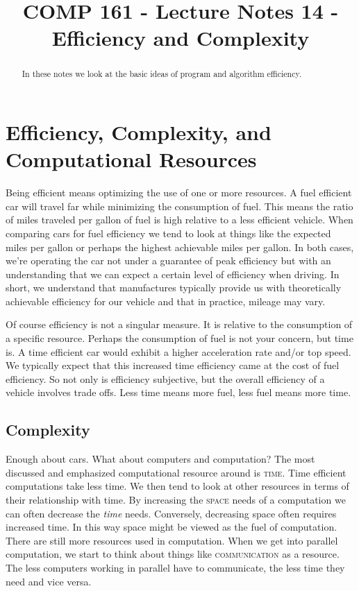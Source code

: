 \documentclass[]{tufte-handout}
\title{COMP 161 - Lecture Notes 14 - Efficiency and Complexity}
\date{}
\begin{document}
 
\maketitle

\begin{abstract}
In these notes we look at the basic ideas of program and algorithm efficiency.
\end{abstract}

\section{Efficiency, Complexity, and Computational Resources}

Being efficient means optimizing the use of one or more resources.  A fuel efficient car will travel far while minimizing the consumption of fuel. This means the ratio of miles traveled per gallon of fuel is high relative to a less efficient vehicle.  When comparing cars for fuel efficiency we tend to look at things like the expected miles per gallon or perhaps the highest achievable miles per gallon. In both cases, we're operating the car not under a guarantee of peak efficiency but with an understanding that we can expect a certain level of efficiency when driving. In short, we understand that manufactures typically provide us with theoretically achievable efficiency for our vehicle and that in practice, mileage may vary. 

Of course efficiency is not a singular measure. It is relative to the consumption of a specific resource.  Perhaps the consumption of fuel is not your concern, but time is.  A time efficient car would exhibit a higher acceleration rate and/or top speed.  We typically expect that this increased time efficiency came at the cost of fuel efficiency. So not only is efficiency subjective, but the overall efficiency of a vehicle involves trade offs.  Less time means more fuel, less fuel means more time. 

\subsection{Complexity}

Enough about cars. What about computers and computation? The most discussed and emphasized computational resource around is \textsc{time}. Time efficient computations take less time.  We then tend to look at other resources in terms of their relationship with time. By increasing the \textsc{space} needs of a computation we can often decrease the \textit{time} needs.  Conversely, decreasing space often requires increased time. In this way space might be viewed as the fuel of computation. There are still more resources used in computation. When we get into parallel computation, we start to think about things like \textsc{communication} as a resource.  The less computers working in parallel have to communicate, the less time they need and vice versa.  
\end{document}

